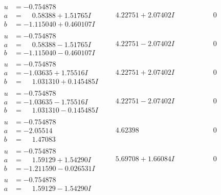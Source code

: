 \documentclass[1p]{elsarticle_modified}
\theoremstyle{definition}
\begin{document}
$$\begin{array}{c|c|c}
\begin{aligned}
u &= -0.754878\phantom{ +0.000000I} \\
a &= \phantom{-}0.58388 + 1.51765 I \\
b &= -1.115040 + 0.460107 I\end{aligned}
 & \phantom{-}4.22751 + 2.07402 I & \phantom{-0.000000 } 0 \\ \hline\begin{aligned}
u &= -0.754878\phantom{ +0.000000I} \\
a &= \phantom{-}0.58388 - 1.51765 I \\
b &= -1.115040 - 0.460107 I\end{aligned}
 & \phantom{-}4.22751 - 2.07402 I & \phantom{-0.000000 } 0 \\ \hline\begin{aligned}
u &= -0.754878\phantom{ +0.000000I} \\
a &= -1.03635 + 1.75516 I \\
b &= \phantom{-}1.031310 + 0.145485 I\end{aligned}
 & \phantom{-}4.22751 + 2.07402 I & \phantom{-0.000000 } 0 \\ \hline\begin{aligned}
u &= -0.754878\phantom{ +0.000000I} \\
a &= -1.03635 - 1.75516 I \\
b &= \phantom{-}1.031310 - 0.145485 I\end{aligned}
 & \phantom{-}4.22751 - 2.07402 I & \phantom{-0.000000 } 0 \\ \hline\begin{aligned}
u &= -0.754878\phantom{ +0.000000I} \\
a &= -2.05514\phantom{ +0.000000I} \\
b &= \phantom{-}1.47083\phantom{ +0.000000I}\end{aligned}
 & \phantom{-}4.62398\phantom{ +0.000000I} & \phantom{-0.000000 } 0 \\ \hline\begin{aligned}
u &= -0.754878\phantom{ +0.000000I} \\
a &= \phantom{-}1.59129 + 1.54290 I \\
b &= -1.211590 - 0.026531 I\end{aligned}
 & \phantom{-}5.69708 + 1.66084 I & \phantom{-0.000000 } 0 \\ \hline\begin{aligned}
u &= -0.754878\phantom{ +0.000000I} \\
a &= \phantom{-}1.59129 - 1.54290 I \\

\end{aligned}
\end{array}$$
\end{document}
